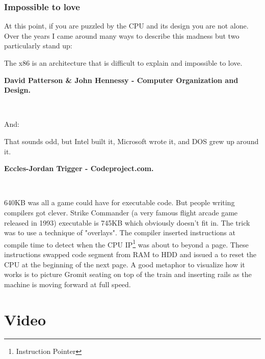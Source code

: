 \documentclass[book.tex]{subfiles}
\begin{document}
\subsubsection{Impossible to love}
At this point, if you are puzzled by the CPU and its design you are not alone. Over the years I came around many ways to describe this madness but two particularly stand up:\\
\par
 \begin{fancyquotes}
   The x86 is an architecture that is difficult to explain and impossible to love.\\
   \par
\textbf{David Patterson \& John Hennessy - Computer Organization and Design.}
 \end{fancyquotes}\\
\par
And:
\par
 \begin{fancyquotes}
    That sounds odd, but Intel built it, Microsoft wrote it, and DOS grew up around it.\\
   \par
\textbf{Eccles-Jordan Trigger - Codeproject.com.}
 \end{fancyquotes}\\



\par
{} 640KB was all a game could have for executable code. But people writing compilers got clever. Strike Commander (a very famous flight arcade game released in 1993) executable is 745KB which obviously doesn't fit in. The trick was to use a technique of "overlays". The compiler inserted instructions at compile time to detect when the CPU IP\footnote{Instruction Pointer} was about to beyond a page. These instructions swapped code segment from RAM to HDD and issued a  to reset the CPU at the beginning of the next page. A good metaphor to visualize how it works is to picture Gromit seating on top of the train and inserting rails as the machine is moving forward at full speed.

















\section{Video}
\end{document}
